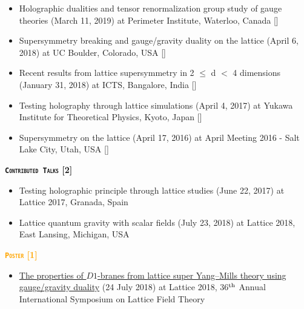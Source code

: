 \begin{itemize}
  \item Holographic dualities and tensor renormalization group study of gauge theories (March 11, 2019) at Perimeter Institute, Waterloo, Canada 
 [\texttt{\textbf{}}] 
\vspace{1mm} 


  \item Supersymmetry breaking and gauge/gravity duality on the lattice (April 6, 2018) at UC Boulder, Colorado, USA 
    [\texttt{\textbf{}}] 
  \vspace{1mm} 
  
  
  \item Recent results from lattice supersymmetry in 2 $\le$ d $<$ 4 dimensions (January 31, 2018) at ICTS, Bangalore, India 
   [\texttt{\textbf{}}] 
  \vspace{1mm} 
  
 \item Testing holography through lattice simulations (April 4, 2017) at Yukawa Institute for Theoretical Physics, Kyoto, Japan
  [\texttt{\textbf{}}]  
 \vspace{1mm} 
 
 
\item Supersymmetry on the lattice (April 17, 2016) at April Meeting 2016 - Salt Lake City, Utah, USA 
 [\texttt{\textbf{}}] 
\end{itemize}



\textcolor{bittersweet}{\textbf{\textsc{\fontsize{10}{38} \bfseries \texttt{Contributed Talks} [2]}}}
\begin{itemize}
  \item Testing holographic principle through lattice studies (June 22, 2017) at Lattice 2017, Granada, Spain \vspace{1mm} 
  \item Lattice quantum gravity with scalar fields (July 23, 2018) at Lattice 2018, East Lansing, Michigan, USA   
\end{itemize}
 

\textcolor{orange}{\textbf{\textsc{\fontsize{10}{38} \bfseries \texttt{Poster} [1]}}}
  \begin{itemize}
 \item \href{https://indico.fnal.gov/event/15949/session/4/contribution/66}{The properties of $D1$-branes from lattice super Yang--Mills theory using gauge/gravity duality} (24 July 2018) 
 at Lattice 2018, 36$^{\rm{th}}$ Annual International Symposium on Lattice Field Theory
\end{itemize}
